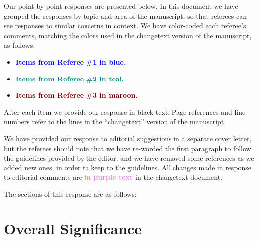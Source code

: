 \documentclass[11pt]{article}
\makeatletter
\renewcommand\tableofcontents{%
    \@starttoc{toc}%
}
\makeatother
\begin{document}
Our point-by-point responses are presented below. In this document we have grouped the responses by topic and area of the manuscript, so that referees can see responses to similar concerns in context.   We have color-coded each referee's comments, matching the colors used in the changetext version of the manuscript, as follows:

\begin{itemize}
\item \textbf{\textcolor{blue}{Items from Referee \#1 in blue.}}
\item \textbf{\textcolor{teal}{Items from Referee \#2 in teal.}}
\item \textbf{\textcolor{Maroon}{Items from Referee \#3 in maroon.}}
\end{itemize}

After each item we provide our response in black text.  Page references and line numbers refer to the lines in the ``changetext'' version of the manuscript.

We have provided our response to editorial suggestions in a separate cover letter, but the referees should note that we have re-worded the first paragraph to follow the guidelines provided by the editor, and we have removed some references as we added new ones, in order to keep to the guidelines.  All changes made in response to editorial comments are  \textbf{\textcolor{violet}{in purple text}} in the changetext document.

The sections of this response are as follows: \\
\bigskip

\tableofcontents

\clearpage

\section{Overall Significance}
\end{document}
